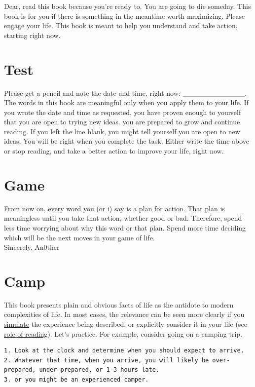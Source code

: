 \documentclass[
]{book}
\begin{document}
Dear, read this book because you're ready to.
You are going to die someday. This book is for you if there is something in the meantime worth maximizing.
Please engage your life. This book is meant to help you understand and take action, starting right now.

\section{Test}\label{test}

Please get a pencil and note the date and time, right now: \_\_\_\_\_\_\_\_\_\_\_\_.
The words in this book are meaningful only when you apply them to your life.
If you wrote the date and time as requested, you have proven enough to yourself that you are open to trying new ideas. you are prepared to grow and continue reading.
If you left the line blank, you might tell yourself you are open to new ideas. You will be right when you complete the task.
Either write the time above or stop reading, and take a better action to improve your life, right now.

\section{Game}\label{game}

From now on, every word you (or i) say is a plan for action.
That plan is meaningless until you take that action, whether good or bad.
Therefore, spend less time worrying about why this word or that plan.
Spend more time deciding which will be the next moves in your game of life.\\
Sincerely, An0ther

\section{Camp}\label{camp}

This book presents plain and obvious facts of life as the antidote to modern complexities of life.
In most cases, the relevance can be seen more clearly if you \hyperref[words]{simulate} the experience being described, or explicitly consider it in your life (see \hyperref[read]{role of reading}). Let's practice. For example, consider going on a camping trip.

\begin{verbatim}
1. Look at the clock and determine when you should expect to arrive.
2. Whatever that time, when you arrive, you will likely be over- prepared, under-prepared, or 1-3 hours late.
3. or you might be an experienced camper.
\end{verbatim}
\end{document}
